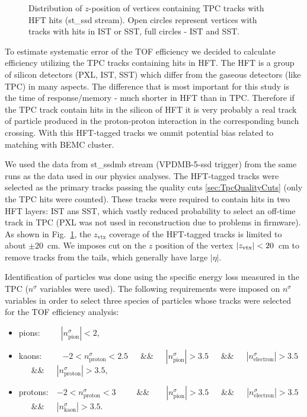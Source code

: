\begin{figure}[b!]
\begin{minipage}{.4725\textwidth}
  \caption[Distribution of $z$-position of vertices with TPC tracks containing hits in HFT.]
   {Distribution of $z$-position of vertices containing TPC tracks with HFT hits (st\_ssd stream). Open circles represent vertices with tracks with hits in IST or SST, full circles - IST and SST.}
   \label{fig:zVtxHFT}%
\end{minipage}%
\end{figure}%

To estimate systematic error of the TOF efficiency we decided to calculate efficiency utilizing the TPC tracks containing hits in HFT. The HFT is a group of silicon detectors (PXL, IST, SST) which differ from the gaseous detectors (like TPC) in many aspects. The difference that is most important for this study is the time of response/memory - much shorter in HFT than in TPC. Therefore if the TPC track contain hits in the silicon of HFT it is very probably a real track of particle produced in the proton-proton interaction in the corresponding bunch crossing. With this HFT-tagged tracks we ommit potential bias related to matching with BEMC cluster.

We used the data from st\_ssdmb stream (VPDMB-5-ssd trigger) from the same runs as the data used in our physics analyses. The HFT-tagged tracks were selected as the primary tracks passing the quality cuts \ref{sec:TpcQualityCuts} (only the TPC hits were counted). These tracks were required to contain hits in two HFT layers: IST ans SST, which vastly reduced probability to select an off-time track in TPC (PXL was not used in reconstruction due to problems in firmware). As shown in Fig.~\ref{fig:zVtxHFT}, the $z_{\text{vtx}}$ coverage of the HFT-tagged tracks is limited to about $\pm20$~cm. We imposes cut on the $z$ position of the vertex $|z_{\text{\text{vtx}}}|<20$~cm to remove tracks from the tails, which generally have large $|\eta|$.

Identification of particles was done using the specific energy loss measured in the TPC ($n^{\sigma}$ variables were used). The following requirements were imposed on $n^{\sigma}$ variables in order to select three species of particles whose tracks were selected for the TOF efficiency analysis:
\begin{itemize}
 \item pions:~~~~~$|n^{\sigma}_{\text{pion}}| < 2$,
 \item kaons:~~~~~$-2 < n^{\sigma}_{\text{proton}} < 2.5$~~~\&\&~~~$|n^{\sigma}_{\text{pion}}| > 3.5$~~~\&\&~~~$|n^{\sigma}_{\text{electron}}| > 3.5$~~~\&\&~~~$|n^{\sigma}_{\text{proton}}| > 3.5$,
 \item protons:~~$-2 < n^{\sigma}_{\text{proton}} < 3$~~~~~\&\&~~~~$|n^{\sigma}_{\text{pion}}| > 3.5$~~~\&\&~~~$|n^{\sigma}_{\text{electron}}| > 3.5$~~~\&\&~~~$|n^{\sigma}_{\text{kaon}}| > 3.5$.
\end{itemize} 

